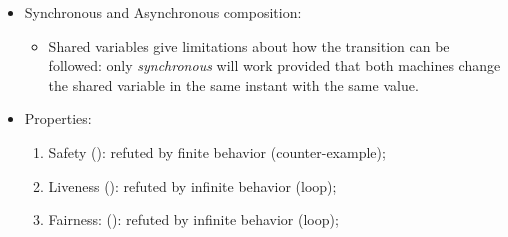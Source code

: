 \begin{itemize}

	\item	Synchronous and Asynchronous composition:

		\begin{itemize}
		\item	Shared variables give limitations about how the transition
                can be followed: only \emph{synchronous} will work
                provided that both machines change the shared variable in
                the same instant with the same value.
		\end{itemize}

    \item   Properties:

        \begin{enumerate}
        \item   Safety (): refuted by finite behavior
                (counter-example);
        \item   Liveness (): refuted by infinite
                behavior (loop);
        \item   Fairness: (): refuted by
                infinite behavior (loop);
        \end{enumerate}

\end{itemize}

